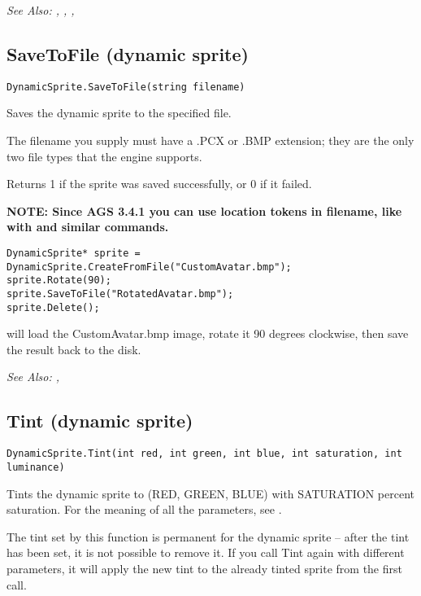 \it{See Also:} ,
,
,


\subsection{SaveToFile (dynamic sprite)}\label{DynamicSprite.SaveToFile}%

\begin{verbatim}
DynamicSprite.SaveToFile(string filename)
\end{verbatim}
Saves the dynamic sprite to the specified file.

The filename you supply must have a .PCX or .BMP extension; they are the only
two file types that the engine supports.

Returns 1 if the sprite was saved successfully, or 0 if it failed.

\bf{NOTE:} Since AGS 3.4.1 you can use location tokens in filename, like with  and similar commands.

\begin{verbatim}
DynamicSprite* sprite = DynamicSprite.CreateFromFile("CustomAvatar.bmp");
sprite.Rotate(90);
sprite.SaveToFile("RotatedAvatar.bmp");
sprite.Delete();
\end{verbatim}
will load the CustomAvatar.bmp image, rotate it 90 degrees clockwise, then
save the result back to the disk.

\it{See Also:} ,


\subsection{Tint (dynamic sprite)}\label{DynamicSprite.Tint}%

\begin{verbatim}
DynamicSprite.Tint(int red, int green, int blue, int saturation, int luminance)
\end{verbatim}
Tints the dynamic sprite to (RED, GREEN, BLUE) with SATURATION percent
saturation. For the meaning of all the parameters, see .

The tint set by this function is permanent for the dynamic sprite -- after the tint
has been set, it is not possible to remove it. If you call Tint again with different
parameters, it will apply the new tint to the already tinted sprite from the first call.

